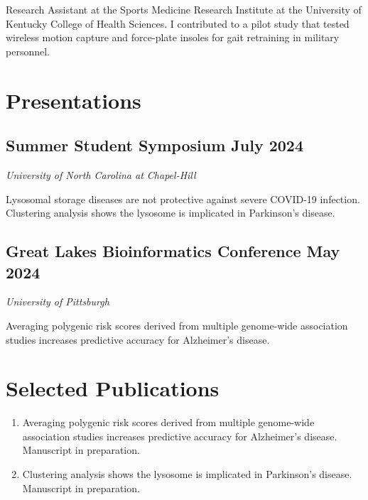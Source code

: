 \documentclass{article}
\begin{document}
\begin{flushleft}
Research Assistant at the Sports Medicine Research Institute at the University of Kentucky College of Health Sciences. 
I contributed to a pilot study that tested wireless motion capture and force-plate insoles for gait retraining in military
personnel. 

\section*{Presentations}
\subsection*{Summer Student Symposium {\hfill\normalsize\normalfont July 2024}}
\textit{University of North Carolina at Chapel-Hill}

Lysosomal storage diseases are not protective against severe COVID-19 infection. Clustering analysis shows the lysosome is implicated in Parkinson's disease.

\subsection*{Great Lakes Bioinformatics Conference {\hfill\normalsize\normalfont May 2024}}
\textit{University of Pittsburgh \vspace{0.5em}}

Averaging polygenic risk scores derived from multiple genome-wide association studies increases predictive accuracy for Alzheimer’s disease.

\section*{Selected Publications}
\begin{enumerate}
\item Averaging polygenic risk scores derived from multiple genome-wide association studies increases predictive accuracy for Alzheimer’s disease. Manuscript in preparation.
\item Clustering analysis shows the lysosome is implicated in Parkinson's disease. Manuscript in preparation.
\end{enumerate}

\end{flushleft}
\end{document}
